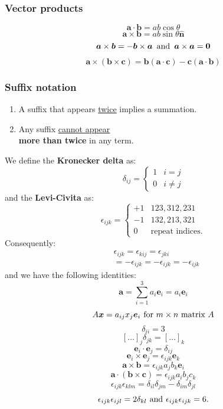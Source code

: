 \documentclass{article}
\newcommand{\vc}[1]{\boldsymbol{#1}}
\begin{document}
\begin{multicols*}{3}
\noindent

\subsubsection*{Vector products}
$$\boldsymbol{a}\cdot\boldsymbol{b}=ab\cos\theta$$
$$\boldsymbol{a}\times
\boldsymbol{b}=ab\sin\theta\hat{\boldsymbol{n}}$$
$$\boldsymbol{a}\times\boldsymbol{b}
=-\boldsymbol{b}\times\boldsymbol{a}
\hspace{0.07in}\text{and}\hspace{0.07in}
\vc{a}\times\vc{a}=\vc{0}$$
$$\boldsymbol{a}\times(\boldsymbol{b}\times\boldsymbol{c})
=\boldsymbol{b}(\boldsymbol{a}\cdot\boldsymbol{c})
-\boldsymbol{c}(\boldsymbol{a}\cdot\boldsymbol{b})$$

\subsubsection*{Suffix notation}
\begin{enumerate}
    \item A suffix that appears \underline{twice}
    implies a summation.
    \item Any suffix \underline{cannot appear} \\ 
    \textbf{more than twice} in any term.
\end{enumerate}
We define the \textbf{Kronecker delta} as:
$$\delta_{ij}=\left\{\begin{array}{ll}
    1 & i=j \\
    0 & i\neq j
\end{array}\right.$$
and the \textbf{Levi-Civita} as:
$$\epsilon_{ijk}=\left\{
\begin{array}{lll}
    +1 & 123,312,231 \\
    -1 & 132,213,321 \\
    0 & \text{repeat indices.}
\end{array}\right.$$
Consequently:
\begin{align*}
    &\epsilon_{ijk}=\epsilon_{kij}=\epsilon_{jki} \\
    &=-\epsilon_{ijk}=-\epsilon_{ijk}=-\epsilon_{ijk}
\end{align*}
and we have the following identities:
$$\boldsymbol{a}
=\sum_{i=1}^{3}a_i\boldsymbol{e}_i
=a_i\boldsymbol{e}_i$$
$$A\boldsymbol{x}=a_{ij}x_j\boldsymbol{e}_i
\hspace{0.05in}\text{for $m\times n$ matrix $A$}$$
$$\delta_{ii}=3$$
$$[\dots]_j\delta_{jk}
=[\dots]_k$$
$$\boldsymbol{e}_i\cdot
\boldsymbol{e}_j=\delta_{ij}$$
$$\boldsymbol{e}_i\times
\boldsymbol{e}_j=
\epsilon_{ijk}\boldsymbol{e}_k$$
$$\boldsymbol{a}\times\boldsymbol{b}
=\epsilon_{ijk}a_j b_k\boldsymbol{e}_i$$
$$\boldsymbol{a}\cdot
(\boldsymbol{b}\times\boldsymbol{c})
=\epsilon_{ijk}a_i b_j c_k$$
$$\epsilon_{ijk}\epsilon_{klm}
=\delta_{il}\delta_{jm}
-\delta_{im}\delta_{jl}$$
$$\epsilon_{ijk}\epsilon_{ijl}
=2\delta_{kl}
\hspace{0.05in}\text{and}\hspace{0.05in}
\epsilon_{ijk}\epsilon_{ijk}=6.$$


\end{multicols*}
\end{document}
